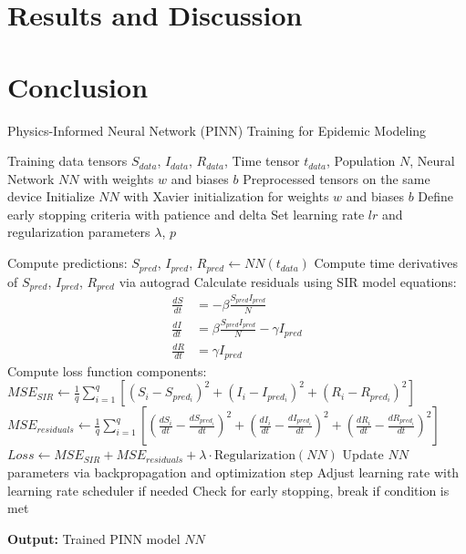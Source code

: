 \documentclass[12pt]{article}
\begin{document}
\section{Results and Discussion}





\section{Conclusion}




\begin{algorithm}
\caption{Physics-Informed Neural Network (PINN) Training for Epidemic Modeling}
\begin{algorithmic}[1]
\Require Training data tensors $S_{data}$, $I_{data}$, $R_{data}$, Time tensor $t_{data}$, Population $N$, Neural Network $NN$ with weights $w$ and biases $b$
\Ensure Preprocessed tensors on the same device
\State Initialize $NN$ with Xavier initialization for weights $w$ and biases $b$
\State Define early stopping criteria with patience and delta
\State Set learning rate $lr$ and regularization parameters $\lambda$, $p$

    \State Compute predictions: $S_{pred}$, $I_{pred}$, $R_{pred} \gets NN(t_{data})$
    \State Compute time derivatives of $S_{pred}$, $I_{pred}$, $R_{pred}$ via autograd
    \State Calculate residuals using SIR model equations:
    \begin{align*}
    \frac{dS}{dt} & = -\beta \frac{S_{pred} I_{pred}}{N} \\
    \frac{dI}{dt} & = \beta \frac{S_{pred} I_{pred}}{N} - \gamma I_{pred} \\
    \frac{dR}{dt} & = \gamma I_{pred}
    \end{align*}
    \State Compute loss function components:
    \State $MSE_{SIR} \gets \frac{1}{q} \sum_{i=1}^{q} \left[ \left(S_{i} - S_{pred_i}\right)^2 + \left(I_{i} - I_{pred_i}\right)^2 + \left(R_{i} - R_{pred_i}\right)^2 \right]$
    \State $MSE_{residuals} \gets \frac{1}{q} \sum_{i=1}^{q} \left[ \left(\frac{dS_i}{dt} - \frac{dS_{pred_i}}{dt}\right)^2 + \left(\frac{dI_i}{dt} - \frac{dI_{pred_i}}{dt}\right)^2 + \left(\frac{dR_i}{dt} - \frac{dR_{pred_i}}{dt}\right)^2 \right]$
    \State $Loss \gets MSE_{SIR} + MSE_{residuals} + \lambda \cdot \text{Regularization}(NN)$
    \State Update $NN$ parameters via backpropagation and optimization step
    \State Adjust learning rate with learning rate scheduler if needed
    \State Check for early stopping, break if condition is met
\EndFor

\State \textbf{Output:} Trained PINN model $NN$
\end{algorithmic}
\end{algorithm}
\end{document}
